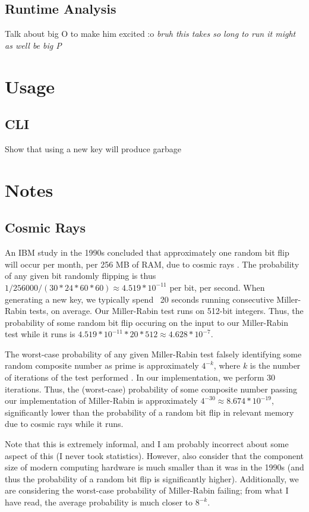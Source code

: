 \documentclass{article}
\begin{document}
\subsection{Runtime Analysis}
Talk about big O to make him excited :o \textit{bruh this takes so long to run it might as well be big P}


\section{Usage}
\subsection{CLI}
Show that using a new key will produce garbage


\section{Notes}
\subsection{Cosmic Rays}
\label{sec:rays}
An IBM study in the 1990s concluded that approximately one random bit flip will occur per month, per 256 MB of RAM, due to cosmic rays \cite{cosmic}. The probability of any given bit randomly flipping is thus $1 / 256000 / (30 * 24 * 60 * 60) \approx 4.519 * 10^{-11}$ per bit, per second. When generating a new key, we typically spend ~20 seconds running consecutive Miller-Rabin tests, on average. Our Miller-Rabin test runs on 512-bit integers. Thus, the probability of some random bit flip occuring on the input to our Miller-Rabin test while it runs is $4.519 * 10^{-11} * 20 * 512 \approx 4.628 * 10^{-7}$.

The worst-case probability of any given Miller-Rabin test falsely identifying some random composite number as prime is approximately $4^{-k }$, where $k$ is the number of iterations of the test performed \cite{wolfram}. In our implementation, we perform 30 iterations. Thus, the (worst-case) probability of some composite number passing our implementation of Miller-Rabin is approximately $4^{-30} \approx 8.674 * 10^{-19}$, significantly lower than the probability of a random bit flip in relevant memory due to cosmic rays while it runs.

Note that this is extremely informal, and I am probably incorrect about some aspect of this (I never took statistics). However, also consider that the component size of modern computing hardware is much smaller than it was in the 1990s (and thus the probability of a random bit flip is significantly higher). Additionally, we are considering the worst-case probability of Miller-Rabin failing; from what I have read, the average probability is much closer to $8^{-k}$.
\end{document}
